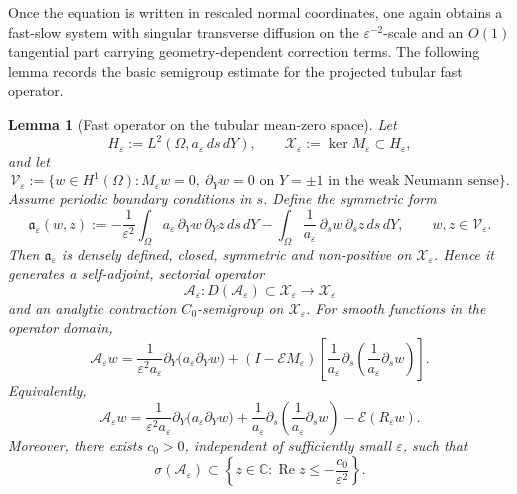 \documentclass[11pt]{article}
\newtheorem{lemma}[theorem]{Lemma}
\theoremstyle{definition}
\theoremstyle{remark}
\numberwithin{equation}{section}
\newcommand{\mc}[1]{\mathcal{#1}}
\begin{document}
Once the equation is written in rescaled normal coordinates, one again obtains
a fast-slow system with singular transverse diffusion on the
\(\varepsilon^{-2}\)-scale and an \(O(1)\) tangential part carrying
geometry-dependent correction terms. The following lemma records the basic
semigroup estimate for the projected tubular fast operator.

\begin{lemma}[Fast operator on the tubular mean-zero space]
\label{lem:tubular-fast-operator}
Let
\[
H_\varepsilon:=L^2(\Omega,a_\varepsilon\,ds\,dY),
\qquad
\mathcal X_\varepsilon:=\ker M_\varepsilon\subset H_\varepsilon,
\]
and let
\[
\mc V_\varepsilon
:=
\{w\in H^1(\Omega):M_\varepsilon w=0,\ \partial_Yw=0
\text{ on }Y=\pm1\text{ in the weak Neumann sense}\}.
\]
Assume periodic boundary conditions in \(s\). Define the symmetric form
\[
\mathfrak a_\varepsilon(w,z)
:=
-\frac{1}{\varepsilon^2}
\int_\Omega a_\varepsilon\,\partial_Yw\,\partial_Yz\,ds\,dY
-
\int_\Omega \frac{1}{a_\varepsilon}\,\partial_sw\,\partial_sz\,ds\,dY,
\qquad
w,z\in \mc V_\varepsilon.
\]
Then \(\mathfrak a_\varepsilon\) is densely defined, closed, symmetric and
non-positive on \(\mathcal X_\varepsilon\). Hence it generates a
self-adjoint, sectorial operator
\[
\mathcal A_\varepsilon:D(\mathcal A_\varepsilon)\subset
\mathcal X_\varepsilon\to\mathcal X_\varepsilon
\]
and an analytic contraction \(C_0\)-semigroup on \(\mathcal X_\varepsilon\).
For smooth functions in the operator domain,
\[
\mathcal A_\varepsilon w
=
\frac{1}{\varepsilon^2a_\varepsilon}
\partial_Y\!\bigl(a_\varepsilon\partial_Yw\bigr)
+
(I-\mathcal E M_\varepsilon)
\left[
\frac{1}{a_\varepsilon}
\partial_s\!\left(\frac{1}{a_\varepsilon}\partial_sw\right)
\right].
\]
Equivalently,
\[
\mathcal A_\varepsilon w
=
\frac{1}{\varepsilon^2a_\varepsilon}
\partial_Y\!\bigl(a_\varepsilon\partial_Yw\bigr)
+
\frac{1}{a_\varepsilon}
\partial_s\!\left(\frac{1}{a_\varepsilon}\partial_sw\right)
-
\mathcal E(R_\varepsilon w).
\]
Moreover, there exists \(c_0>0\), independent of sufficiently small
\(\varepsilon\), such that
\[
\sigma(\mathcal A_\varepsilon)
\subset
\left\{z\in\mathbb C:\operatorname{Re}z\le
-\frac{c_0}{\varepsilon^2}\right\}.
\]
\end{lemma}
\end{document}
